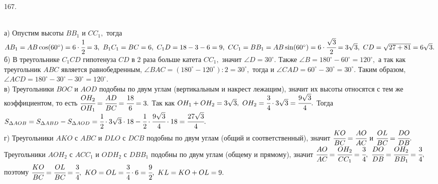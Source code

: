 167. \begin{figure}[ht!]
\end{figure}\\
а) Опустим высоты $BB_1$ и $CC_1,$ тогда $AB_1=AB\cos(60^\circ)=6\cdot\cfrac{1}{2}=3,\ B_1C_1=BC=6,\ C_1D=18-3-6=9,\ CC_1=BB_1=AB\sin(60^\circ)=6\cdot\cfrac{\sqrt{3}}{2}=3\sqrt{3},\ CD=\sqrt{27+81}=6\sqrt{3}.$\\
б) В треугольнике $C_1CD$ гипотенуза $CD$ в 2 раза больше катета $CC_1,$ значит $\angle D=30^\circ.$ Также $\angle B=180^\circ-60^\circ=120^\circ,$ а так как треугольник $ABC$ является равнобедренным, $\angle BAC=(180^\circ-120^\circ):2=30^\circ,$ тогда и $\angle CAD=60^\circ-30^\circ=30^\circ.$ Таким образом, $\angle ACD=180^\circ-30^\circ-30^\circ=120^\circ.$\\
в)  Треугольники $BOC$ и $AOD$ подобны по двум углам (вертикальным и накрест лежащим), значит их высоты относятся с тем же коэффициентом, то есть $\cfrac{OH_2}{OH_1}=\cfrac{AD}{BC}=\cfrac{18}{6}=3.$ Так как $OH_1+OH_2=3\sqrt{3},\ OH_2=\cfrac{3}{4}\cdot3\sqrt{3}=\cfrac{9\sqrt{3}}{4}.$ Тогда $S_{\Delta AOB}=S_{\Delta ABD}-S_{\Delta AOD}=\cfrac{1}{2}\cdot 3\sqrt{3}\cdot 18-\cfrac{1}{2}\cdot \cfrac{9\sqrt{3}}{4}\cdot 18=\cfrac{27\sqrt{3}}{4}.$\\
г) Треугольники $AKO$ с $ABC$ и $DLO$ с $DCB$ подобны по двум углам (общий и соответственный), значит $\cfrac{KO}{BC}=\cfrac{AO}{AC}$ и $\cfrac{OL}{BC}=\cfrac{DO}{DB}.$ Треугольники $AOH_2$ с $ACC_1$ и $ODH_2$ с $DBB_1$ подобны по двум углам (общему и прямому), значит $\cfrac{AO}{AC}=\cfrac{OH_2}{CC_1}=\cfrac{3}{4},\ \cfrac{DO}{DB}=\cfrac{OH_2}{BB_1}=\cfrac{3}{4},$ поэтому $\cfrac{KO}{BC}=\cfrac{OL}{BC}=\cfrac{3}{4},\
KO=OL=\cfrac{3}{4}\cdot6=\cfrac{9}{2},\ KL=KO+OL=9.$\newpage\noindent
